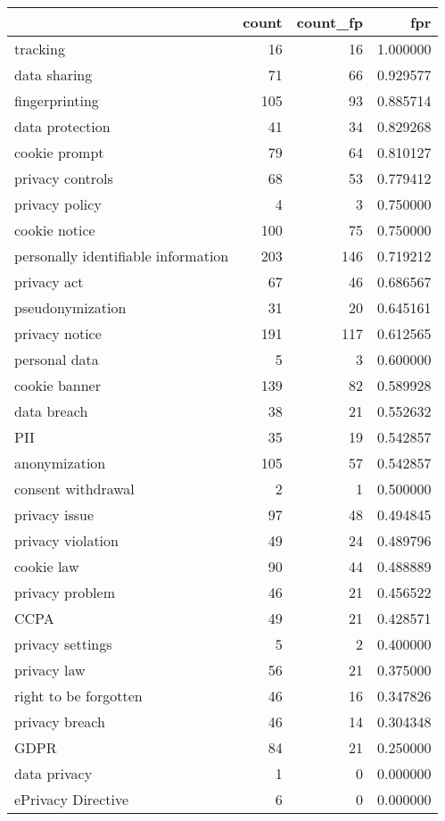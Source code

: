 \begin{tabular}{lrrr}
\toprule
 & count & count_fp & fpr \\
\midrule
tracking & 16 & 16 & 1.000000 \\
data sharing & 71 & 66 & 0.929577 \\
fingerprinting & 105 & 93 & 0.885714 \\
data protection & 41 & 34 & 0.829268 \\
cookie prompt & 79 & 64 & 0.810127 \\
privacy controls & 68 & 53 & 0.779412 \\
privacy policy & 4 & 3 & 0.750000 \\
cookie notice & 100 & 75 & 0.750000 \\
personally identifiable information & 203 & 146 & 0.719212 \\
privacy act & 67 & 46 & 0.686567 \\
pseudonymization & 31 & 20 & 0.645161 \\
privacy notice & 191 & 117 & 0.612565 \\
personal data & 5 & 3 & 0.600000 \\
cookie banner & 139 & 82 & 0.589928 \\
data breach & 38 & 21 & 0.552632 \\
PII & 35 & 19 & 0.542857 \\
anonymization & 105 & 57 & 0.542857 \\
consent withdrawal & 2 & 1 & 0.500000 \\
privacy issue & 97 & 48 & 0.494845 \\
privacy violation & 49 & 24 & 0.489796 \\
cookie law & 90 & 44 & 0.488889 \\
privacy problem & 46 & 21 & 0.456522 \\
CCPA & 49 & 21 & 0.428571 \\
privacy settings & 5 & 2 & 0.400000 \\
privacy law & 56 & 21 & 0.375000 \\
right to be forgotten & 46 & 16 & 0.347826 \\
privacy breach & 46 & 14 & 0.304348 \\
GDPR & 84 & 21 & 0.250000 \\
data privacy & 1 & 0 & 0.000000 \\
ePrivacy Directive & 6 & 0 & 0.000000 \\
\bottomrule
\end{tabular}
